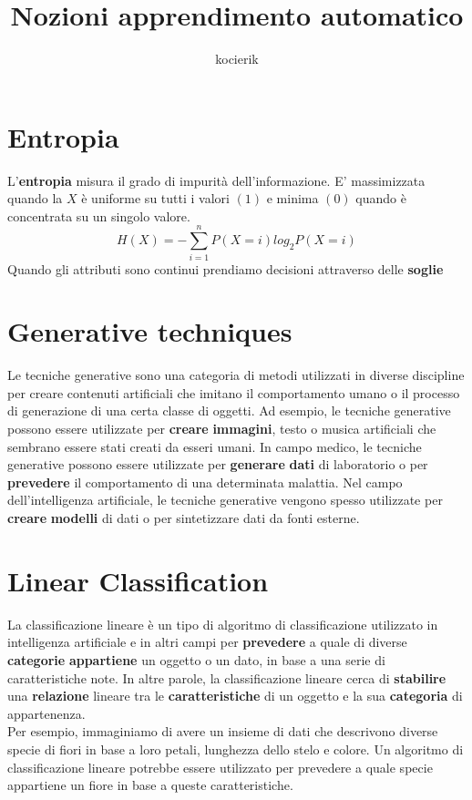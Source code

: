 \documentclass{article}
\title{Nozioni apprendimento automatico}
\author{kocierik}
\begin{document}
\maketitle
\tableofcontents

\section{Entropia}
L'\textbf{entropia} misura il grado di impurità dell'informazione. E' massimizzata quando la $X$ è uniforme su tutti i valori $(1)$ e minima $(0)$ quando è concentrata su un singolo valore.
$$H(X) = -\sum_{i=1}^n P(X=i)log_2P(X=i)$$
Quando gli attributi sono continui prendiamo decisioni attraverso delle \textbf{soglie}

\section{Generative techniques}
Le tecniche generative sono una categoria di metodi utilizzati in diverse discipline per creare contenuti artificiali che imitano il comportamento umano o il processo di generazione di una certa classe di oggetti. Ad esempio, le tecniche generative possono essere utilizzate per \textbf{creare} \textbf{immagini}, testo o musica artificiali che sembrano essere stati creati da esseri umani. In campo medico, le tecniche generative possono essere utilizzate per \textbf{generare} \textbf{dati} di laboratorio o per \textbf{prevedere} il comportamento di una determinata malattia. Nel campo dell'intelligenza artificiale, le tecniche generative vengono spesso utilizzate per \textbf{creare} \textbf{modelli} di dati o per sintetizzare dati da fonti esterne.

\section{Linear Classification}
La classificazione lineare è un tipo di algoritmo di classificazione utilizzato in intelligenza artificiale e in altri campi per \textbf{prevedere} a quale di diverse \textbf{categorie} \textbf{appartiene} un oggetto o un dato, in base a una serie di caratteristiche note. In altre parole, la classificazione lineare cerca di \textbf{stabilire} una \textbf{relazione} lineare tra le \textbf{caratteristiche} di un oggetto e la sua \textbf{categoria} di appartenenza.\\

Per esempio, immaginiamo di avere un insieme di dati che descrivono diverse specie di fiori in base a loro petali, lunghezza dello stelo e colore. Un algoritmo di classificazione lineare potrebbe essere utilizzato per prevedere a quale specie appartiene un fiore in base a queste caratteristiche. \\
\end{document}
